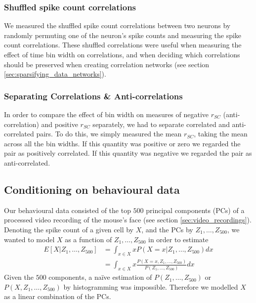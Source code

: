 \documentclass[a4paper,12pt]{article}
\theoremstyle{definition}
\begin{document}
        \subsubsection{Shuffled spike count correlations}
        We measured the shuffled spike count correlations between two neurons by randomly permuting one of the neuron's spike counts and measuring the spike count correlations. These shuffled correlations were useful when measuring the effect of time bin width on correlations, and when deciding which correlations should be preserved when creating correlation networks (see section \ref{sec:sparsifying_data_networks}). 

        \subsubsection{Separating Correlations \& Anti-correlations}\label{sec:corr_anti_corr} 
        In order to compare the effect of bin width on measures of negative $r_{SC}$ (anti-correlation) and positive $r_{SC}$ separately, we had to separate correlated and anti-correlated pairs. To do this, we simply measured the mean $r_{SC}$, taking the mean across all the bin widths. If this quantity was positive or zero we regarded the pair as positively correlated. If this quantity was negative we regarded the pair as anti-correlated.

    \subsection{Conditioning on behavioural data}
    Our behavioural data consisted of the top $500$ principal components (PCs) of a processed video recording of the mouse's face (see section \ref{sec:video_recordings}). Denoting the spike count of a given cell by $X$, and the PCs by $Z_1,\dots,Z_{500}$, we wanted to model $X$ as a function of $Z_1,\dots,Z_{500}$ in order to estimate
    \begin{align}
      E[X|Z_1,\dots,Z_{500}] &= \int_{x \in X} x P(X=x | Z_1,\dots,Z_{500}) dx \\
        &= \int_{x \in X} x \frac{P(X=x, Z_1,\dots,Z_{500})}{P(Z_1,\dots,Z_{500})} dx
    \end{align}
    Given the $500$ components, a na\"{i}ve estimation of $P(Z_1,\dots,Z_{500})$ or $P(X, Z_1,\dots,Z_{500})$ by histogramming was impossible. Therefore we modelled $X$ as a linear combination of the PCs.
\end{document}
